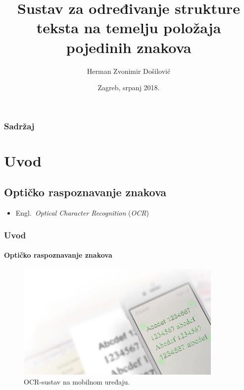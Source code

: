 \documentclass{beamer}
\title[Završni rad br. 5709]{Sustav za određivanje strukture teksta na temelju položaja pojedinih znakova}
\author{Herman Zvonimir Došilović}
\institute[FER]{Sveučilište u Zagrebu\\ Fakultet elektrotehnike i računarstva}
\date{Zagreb, srpanj 2018.}
\begin{document}

\frame{\titlepage}

\begin{frame}
\frametitle{Sadržaj}
\tableofcontents
\end{frame}

\section{Uvod}
\subsection{Optičko raspoznavanje znakova}
\begin{frame}
\begin{itemize}
    \item Engl.~\textit{Optical Character Recognition} (\textit{OCR})
\end{itemize}
\frametitle{Uvod}
\framesubtitle{Optičko raspoznavanje znakova}
\begin{figure}[htb]
    \centering
    \includegraphics[width=10cm]{images/mobile-ocr.jpg}
    \caption{OCR-sustav na mobilnom uređaju. \citep{Microblink}}
    \label{fig:mobile-ocr}
\end{figure}
\end{frame}
\end{document}
